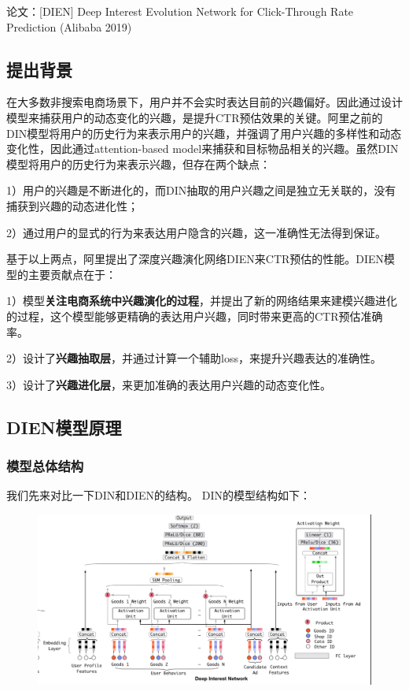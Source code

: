 \documentclass[12pt]{article}
\begin{document}
论文：[DIEN] Deep Interest Evolution Network for Click-Through Rate Prediction (Alibaba 2019)

\subsection{提出背景\cite{Recommender_System_With_Deep_Learning_DIEN}}
在大多数非搜索电商场景下，用户并不会实时表达目前的兴趣偏好。因此通过设计模型来捕获用户的动态变化的兴趣，是提升CTR预估效果的关键。阿里之前的DIN模型将用户的历史行为来表示用户的兴趣，并强调了用户兴趣的多样性和动态变化性，因此通过attention-based model来捕获和目标物品相关的兴趣。虽然DIN模型将用户的历史行为来表示兴趣，但存在两个缺点：

1）用户的兴趣是不断进化的，而DIN抽取的用户兴趣之间是独立无关联的，没有捕获到兴趣的动态进化性；

2）通过用户的显式的行为来表达用户隐含的兴趣，这一准确性无法得到保证。

基于以上两点，阿里提出了深度兴趣演化网络DIEN来CTR预估的性能。DIEN模型的主要贡献点在于：

1）模型\textbf{关注电商系统中兴趣演化的过程}，并提出了新的网络结果来建模兴趣进化的过程，这个模型能够更精确的表达用户兴趣，同时带来更高的CTR预估准确率。

2）设计了\textbf{兴趣抽取层}，并通过计算一个辅助loss，来提升兴趣表达的准确性。

3）设计了\textbf{兴趣进化层}，来更加准确的表达用户兴趣的动态变化性。

\subsection{DIEN模型原理}
\subsubsection{模型总体结构}
我们先来对比一下DIN和DIEN的结构。
DIN的模型结构如下：
\begin{figure}[H]
    \centering
    \includegraphics[width=1\textwidth]{fig/DIEN_Compare_DIN.png}
\end{figure}
\end{document}
